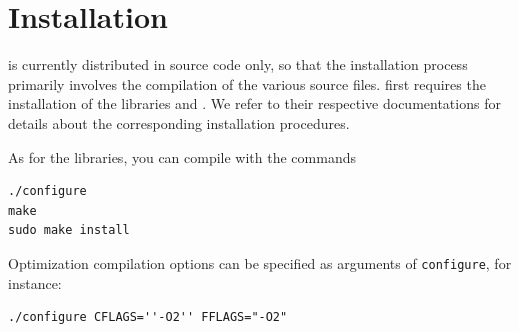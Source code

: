\section{Installation}
\label{sec:installation}

\amlet{} is currently distributed in source code only, so that the
installation process primarily involves the compilation of the various
source files.
\amlet{} first requires the installation of the libraries \oratio{} and \ophelia{}. We refer to their respective documentations for details about the corresponding installation procedures.

As for the libraries, you can compile \amlet{} with the commands
\begin{verbatim}
./configure
make
sudo make install
\end{verbatim}
Optimization compilation options can be specified as arguments of \verb|configure|, for instance:
\begin{verbatim}
./configure CFLAGS=''-O2'' FFLAGS="-O2"
\end{verbatim}
